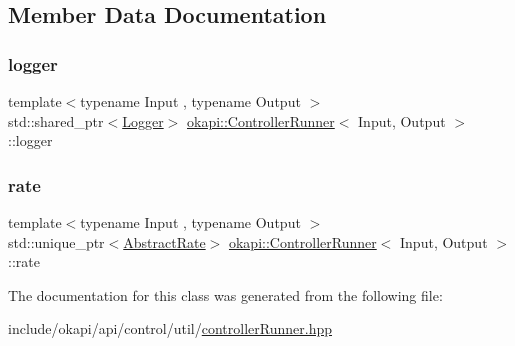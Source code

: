 \subsection{Member Data Documentation}
\mbox{\label{classokapi_1_1ControllerRunner_a0a4d64e7f687666140602d0b6e47a377}} 
\subsubsection{\texorpdfstring{logger}{logger}}
{\footnotesize\ttfamily template$<$typename Input , typename Output $>$ \\
std\+::shared\+\_\+ptr$<$\mbox{\hyperlink{classokapi_1_1Logger}{Logger}}$>$ \mbox{\hyperlink{classokapi_1_1ControllerRunner}{okapi\+::\+Controller\+Runner}}$<$ Input, Output $>$\+::logger\hspace{0.3cm}{\ttfamily [protected]}}

\mbox{\label{classokapi_1_1ControllerRunner_ac3c13044655d54c89e5bb14b1c6bc5f6}} 
\subsubsection{\texorpdfstring{rate}{rate}}
{\footnotesize\ttfamily template$<$typename Input , typename Output $>$ \\
std\+::unique\+\_\+ptr$<$\mbox{\hyperlink{classokapi_1_1AbstractRate}{Abstract\+Rate}}$>$ \mbox{\hyperlink{classokapi_1_1ControllerRunner}{okapi\+::\+Controller\+Runner}}$<$ Input, Output $>$\+::rate\hspace{0.3cm}{\ttfamily [protected]}}



The documentation for this class was generated from the following file\+:\begin{DoxyCompactItemize}
\item 
include/okapi/api/control/util/\mbox{\hyperlink{controllerRunner_8hpp}{controller\+Runner.\+hpp}}\end{DoxyCompactItemize}
